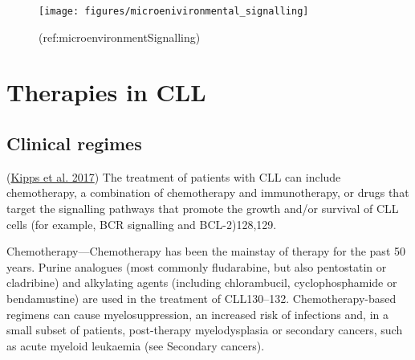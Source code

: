 \documentclass[11pt, a4paper, twosided]{book}
\begin{document}
\begin{figure}

{\centering \texttt{[image: figures/microenivironmental\_signalling]} 

}

\caption{(ref:microenvironmentSignalling)}\label{fig:microenvironmentSignalling}
\end{figure}
\hypertarget{therapies-in-cll}{%
\section{Therapies in CLL}\label{therapies-in-cll}}

\hypertarget{clinical-regimes}{%
\subsection{Clinical regimes}\label{clinical-regimes}}

(\protect\hyperlink{ref-Kipps2017}{Kipps et al. 2017})
The treatment of patients with CLL can include chemotherapy, a combination of chemotherapy and immunotherapy, or drugs that target the signalling pathways that promote the growth and/or survival of CLL cells (for example, BCR signalling and BCL-2)128,129.

Chemotherapy---Chemotherapy has been the mainstay of therapy for the past 50 years. Purine analogues (most commonly fludarabine, but also pentostatin or cladribine) and alkylating agents (including chlorambucil, cyclophosphamide or bendamustine) are used in the treatment of CLL130--132. Chemotherapy-based regimens can cause myelosuppression, an increased risk of infections and, in a small subset of patients, post-therapy myelodysplasia or secondary cancers, such as acute myeloid leukaemia (see Secondary cancers).
\end{document}
